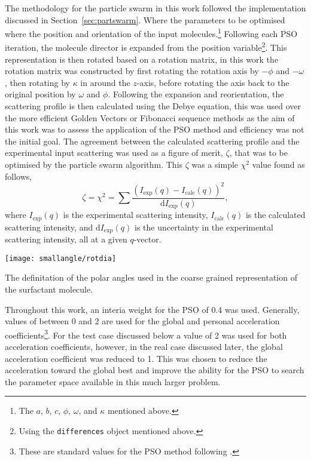 The methodology for the particle swarm in this work followed the implementation discussed in Section~\ref{sec:partswarm}.
Where the parameters to be optimised where the position and orientation of the input molecules.\footnote{The $a$, $b$, $c$, $\phi$, $\omega$, and $\kappa$ mentioned above.}
Following each PSO iteration, the molecule director is expanded from the position variable\footnote{Using the \texttt{differences} object mentioned above.}.
This representation is then rotated based on a rotation matrix, in this work the rotation matrix was constructed by first rotating the rotation axis by $-\phi$ and $-\omega$, then rotating by $\kappa$ in around the $z$-axis, before rotating the axis back to the original position by $\omega$ and $\phi$.
Following the expansion and reorientation, the scattering profile is then calculated using the Debye equation, this was used over the more efficient Golden Vectors or Fibonacci sequence methods as the aim of this work was to assess the application of the PSO method and efficiency was not the initial goal.
The agreement between the calculated scattering profile and the experimental input scattering was used as a figure of merit, $\zeta$, that was to be optimised by the particle swarm algorithm.
This $\zeta$ was a simple $\chi^2$ value found as follows,
%
\begin{equation}
\zeta = \chi^2 = \sum\frac{(I_{\text{exp}}(q) - I_{\text{calc}}(q))^2}{\text{d}I_{\text{exp}}(q)},
\end{equation}
%
where $I_{\text{exp}}(q)$ is the experimental scattering intensity, $I_{\text{calc}}(q)$ is the calculated scattering intensity, and $\text{d}I_{\text{exp}}(q)$ is the uncertainty in the experimental scattering intensity, all at a given $q$-vector.
%
\begin{marginfigure}
    \centering
\texttt{[image: smallangle/rotdia]}
    \caption{The definitation of the polar angles used in the coarse grained representation of the surfactant molecule.}
    \label{fig:rot}
\end{marginfigure}
%

Throughout this work, an interia weight for the PSO of 0.4 was used.
Generally, values of between 0 and 2 are used for the global and personal acceleration coefficients\footnote{These are standard values for the PSO method following \cite{sun_study_2010}.}.
For the test case discussed below a value of 2 was used for both acceleration coefficients, however, in the real case discussed later, the global acceleration coefficient was reduced to 1.
This was chosen to reduce the acceleration toward the global best and improve the ability for the PSO to search the parameter space available in this much larger problem.

